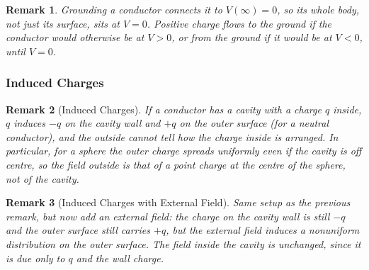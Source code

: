 \documentclass{article}
\newtheorem{remark}{Remark}
\begin{document}
\begin{remark}
    Grounding a conductor connects it to $V(\infty) = 0$, so its whole body, not just its surface, sits at $V = 0$. Positive charge flows to the ground if the conductor would otherwise be at $V > 0$, or from the ground if it would be at $V < 0$, until $V = 0$.
\end{remark}

\subsubsection{Induced Charges}
\begin{remark}[Induced Charges]
    If a conductor has a cavity with a charge $q$ inside, $q$ induces $-q$ on the cavity wall and $+q$ on the outer surface (for a neutral conductor), and the outside cannot tell how the charge inside is arranged. In particular, for a sphere the outer charge spreads uniformly even if the cavity is off centre, so the field outside is that of a point charge at the centre of the sphere, not of the cavity.
\end{remark}
\begin{remark}[Induced Charges with External Field]
    Same setup as the previous remark, but now add an external field: the charge on the cavity wall is still $-q$ and the outer surface still carries $+q$, but the external field induces a nonuniform distribution on the outer surface. The field inside the cavity is unchanged, since it is due only to $q$ and the wall charge.
    \begin{center}
    \end{center}
\end{remark}
\end{document}
